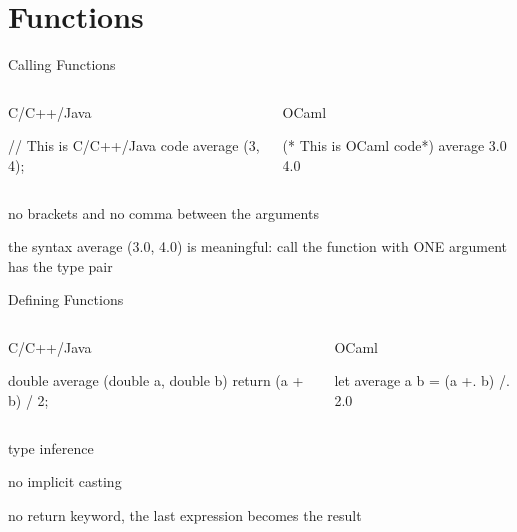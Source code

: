 \documentclass{plt}
\begin{document}
\part{Functions}


\begin{frame}[fragile]{Calling Functions}

  \begin{columns}
      \begin{column}[t]{0.5\textwidth}
C/C++/Java
\begin{C}
// This is C/C++/Java code
average (3, 4);
\end{C}
    \end{column}

    \begin{column}[t]{0.5\textwidth}
OCaml    
\begin{ocaml}
(* This is OCaml code*)
average 3.0 4.0
\end{ocaml}
    \end{column}

  \end{columns}

\vspace{20pt}
\alert{no} brackets and \alert{no} comma between the arguments
  
the syntax average (3.0, 4.0) is meaningful: call the function with ONE argument
has the type \alert{pair}
\end{frame}

\begin{frame}[fragile]{Defining Functions}

  \begin{columns}
      \begin{column}[t]{0.6\textwidth}
C/C++/Java

\begin{C}
double average (double a, double b)
{
  return (a + b) / 2;
}
\end{C}
    \end{column}
    \begin{column}[t]{0.3\textwidth}
OCaml

\begin{ocaml}
let average a b = 
  (a +. b) /. 2.0
\end{ocaml}
    \end{column}

  \end{columns}

type inference

no implicit casting
  
no \alert{return} keyword, the last expression becomes the result
\end{frame}
\end{document}
